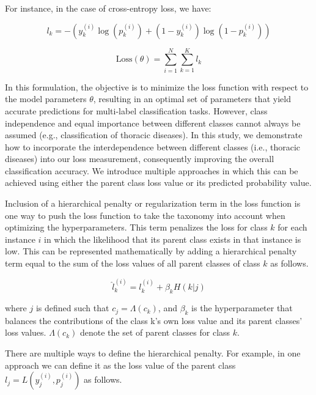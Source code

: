 \documentclass[preprint,3p,times, review]{elsarticle}
\begin{document}
For instance, in the case of cross-entropy loss, we have:

\begin{equation}
    l_k = -\left(y_k^{(i)}\log(p_k^{(i)}) + (1 - y_k^{(i)})\log(1 - p_k^{(i)})\right)
    \label{Taxonomy.Eq.Loss}
\end{equation}

\begin{equation}
    \text{Loss}(\theta) = \sum_{i=1}^{N}\sum_{k=1}^{K}l_k
    \label{Taxonomy.Eq.TotalLoss}
\end{equation}

In this formulation, the objective is to minimize the loss function with respect to the model parameters $\theta $, resulting in an optimal set of parameters that yield accurate predictions for multi-label classification tasks. However, class independence and equal importance between different classes cannot always be assumed (e.g., classification of thoracic diseases). In this study, we demonstrate how to incorporate the interdependence between different classes (i.e., thoracic diseases) into our loss measurement, consequently improving the overall classification accuracy. We introduce multiple approaches in which this can be achieved using either the parent class loss value or its predicted probability value.

Inclusion of a hierarchical penalty or regularization term in the loss function is one way to push the loss function to take the taxonomy into account when optimizing the hyperparameters. This term penalizes the loss for class $k $ for each instance $i $ in which the likelihood that its parent class exists in that instance is low. This can be represented mathematically by adding a hierarchical penalty term equal to the sum of the loss values of all parent classes of class $k $ as follows.

\begin{equation}
    \widehat{l}_{k}^{(i)} = l_{k}^{(i)}+\beta_k H (k \vert j)
    \label{Taxonomy.Eq.3.newloss}
\end{equation}

where $j $ is defined such that $c_j=\Lambda(c_k) $, and $\beta_k $ is the hyperparameter that balances the contributions of the class k's own loss value and its parent classes' loss values. $\Lambda(c_k) $ denote the set of parent classes for class $k $.

There are multiple ways to define the hierarchical penalty. For example, in one approach we can define it as the loss value of the parent class $l_j=L\left(y_j^{(i)},p_j^{(i)}\right) $ as follows.
\end{document}
